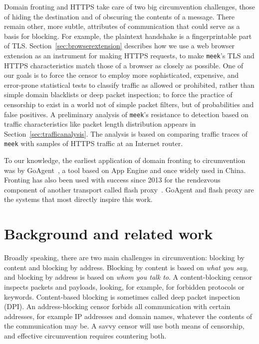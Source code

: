 \documentclass[conference]{IEEEtran}
\newcommand{\meek}{\texttt{meek}\xspace}
\begin{document}
Domain fronting and HTTPS take care of two big circumvention challenges,
those of hiding the destination and of obscuring the contents of a message.
There remain other, more subtle, attributes of communication
that could serve as a basis for blocking.
For example, the plaintext handshake is a fingerprintable part of TLS.
Section~\ref{sec:browserextension} describes how we use a web browser extension as an instrument for making HTTPS requests,
to make \meek's TLS and HTTPS characteristics
match those of a browser as closely as possible.
One of our goals is to force the censor
to employ more sophisticated, expensive, and error-prone statistical tests
to classify traffic as allowed or prohibited,
rather than simple domain blacklists or deep packet inspection;
to force the practice of censorship to exist in a world
not of simple packet filters,
but of probabilities and false positives.
A preliminary analysis of \meek's resistance to detection
based on traffic characteristics like packet length distribution
appears in Section~\ref{sec:trafficanalysis}.
The analysis is based on comparing traffic traces of \meek
with samples of HTTPS traffic at an Internet router.

To our knowledge,
the earliest application of domain fronting to circumvention
was by GoAgent~\cite{goagent},
a tool based on App Engine and
once widely used in China.
Fronting has also been used with success since 2013
for the rendezvous component of another transport called flash proxy~\cite{flashproxy}.
GoAgent and flash proxy are the systems that most directly
inspire this work.


\section{Background and related work}
\label{sec:related-work}

Broadly speaking, there are two main challenges in circumvention:
blocking by content and blocking by address.
Blocking by content is based on \emph{what you say},
and blocking by address is based on \emph{whom you talk to}.
A content-blocking censor inspects packets and payloads,
looking, for example, for forbidden protocols or keywords.
Content-based blocking is sometimes called deep packet inspection (DPI).
An address-blocking censor forbids all communication with certain
addresses, for example IP addresses and domain names, whatever the contents of the communication may be.
A savvy censor will use both means of censorship, and
effective circumvention requires countering both.
\end{document}
